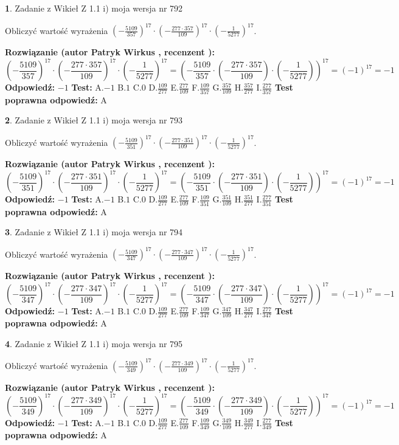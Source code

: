 \documentclass[12pt, a4paper]{article}
\theoremstyle{definition} %
\newtheorem{zad}{}
\newcommand{\zadStart}[1]{\begin{zad}#1\newline}
\newcommand{\zadStop}{\end{zad}}
\newcommand{\rozwStart}[2]{\noindent \textbf{Rozwiązanie (autor #1 , recenzent #2): }\newline}
\newcommand{\rozwStop}{\newline}
\newcommand{\odpStart}{\noindent \textbf{Odpowiedź:}\newline}
\newcommand{\odpStop}{\newline}
\newcommand{\testStart}{\noindent \textbf{Test:}\newline}
\newcommand{\testStop}{\newline}
\newcommand{\kluczStart}{\noindent \textbf{Test poprawna odpowiedź:}\newline}
\newcommand{\kluczStop}{\newline}
\begin{document}
\zadStart{Zadanie z Wikieł Z 1.1 i) moja wersja nr 792}

Obliczyć wartość wyrażenia $(-\frac{5109}{357})^{17} \cdot (-\frac{277 \cdot 357}{109})^{17} \cdot (-\frac{1}{5277})^{17}$.
\zadStop
\rozwStart{Patryk Wirkus}{}
$$(-\frac{5109}{357})^{17} \cdot (-\frac{277 \cdot 357}{109})^{17} \cdot (-\frac{1}{5277})^{17} = (-\frac{5109}{357} \cdot (-\frac{277 \cdot 357}{109}) \cdot (-\frac{1}{5277}))^{17} = (-1)^{17} = -1$$
\rozwStop
\odpStart
$-1$
\odpStop
\testStart
A.$-1$ B.$1$ C.$0$ D.$\frac{109}{277}$ E.$\frac{277}{109}$
F.$\frac{109}{357}$ G.$\frac{357}{109}$
H.$\frac{357}{277}$
I.$\frac{277}{357}$
\testStop
\kluczStart
A
\kluczStop



\zadStart{Zadanie z Wikieł Z 1.1 i) moja wersja nr 793}

Obliczyć wartość wyrażenia $(-\frac{5109}{351})^{17} \cdot (-\frac{277 \cdot 351}{109})^{17} \cdot (-\frac{1}{5277})^{17}$.
\zadStop
\rozwStart{Patryk Wirkus}{}
$$(-\frac{5109}{351})^{17} \cdot (-\frac{277 \cdot 351}{109})^{17} \cdot (-\frac{1}{5277})^{17} = (-\frac{5109}{351} \cdot (-\frac{277 \cdot 351}{109}) \cdot (-\frac{1}{5277}))^{17} = (-1)^{17} = -1$$
\rozwStop
\odpStart
$-1$
\odpStop
\testStart
A.$-1$ B.$1$ C.$0$ D.$\frac{109}{277}$ E.$\frac{277}{109}$
F.$\frac{109}{351}$ G.$\frac{351}{109}$
H.$\frac{351}{277}$
I.$\frac{277}{351}$
\testStop
\kluczStart
A
\kluczStop



\zadStart{Zadanie z Wikieł Z 1.1 i) moja wersja nr 794}

Obliczyć wartość wyrażenia $(-\frac{5109}{347})^{17} \cdot (-\frac{277 \cdot 347}{109})^{17} \cdot (-\frac{1}{5277})^{17}$.
\zadStop
\rozwStart{Patryk Wirkus}{}
$$(-\frac{5109}{347})^{17} \cdot (-\frac{277 \cdot 347}{109})^{17} \cdot (-\frac{1}{5277})^{17} = (-\frac{5109}{347} \cdot (-\frac{277 \cdot 347}{109}) \cdot (-\frac{1}{5277}))^{17} = (-1)^{17} = -1$$
\rozwStop
\odpStart
$-1$
\odpStop
\testStart
A.$-1$ B.$1$ C.$0$ D.$\frac{109}{277}$ E.$\frac{277}{109}$
F.$\frac{109}{347}$ G.$\frac{347}{109}$
H.$\frac{347}{277}$
I.$\frac{277}{347}$
\testStop
\kluczStart
A
\kluczStop



\zadStart{Zadanie z Wikieł Z 1.1 i) moja wersja nr 795}

Obliczyć wartość wyrażenia $(-\frac{5109}{349})^{17} \cdot (-\frac{277 \cdot 349}{109})^{17} \cdot (-\frac{1}{5277})^{17}$.
\zadStop
\rozwStart{Patryk Wirkus}{}
$$(-\frac{5109}{349})^{17} \cdot (-\frac{277 \cdot 349}{109})^{17} \cdot (-\frac{1}{5277})^{17} = (-\frac{5109}{349} \cdot (-\frac{277 \cdot 349}{109}) \cdot (-\frac{1}{5277}))^{17} = (-1)^{17} = -1$$
\rozwStop
\odpStart
$-1$
\odpStop
\testStart
A.$-1$ B.$1$ C.$0$ D.$\frac{109}{277}$ E.$\frac{277}{109}$
F.$\frac{109}{349}$ G.$\frac{349}{109}$
H.$\frac{349}{277}$
I.$\frac{277}{349}$
\testStop
\kluczStart
A
\kluczStop
\end{document}
